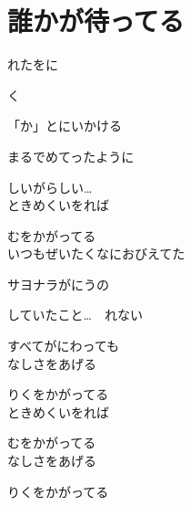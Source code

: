 \section{ 誰かが待ってる}
\large{

れたをに

く

「か」とにいかける

まるでめてったように

しいがらしい…
\\

ときめくいをれば 

むをかがってる
\\

いつもぜいたくなにおびえてた

サヨナラがにうの

していたこと…　れない

すべてがにわっても
\\

なしさをあげる

りくをかがってる
\\

ときめくいをれば 

むをかがってる
\\

なしさをあげる

りくをかがってる

}